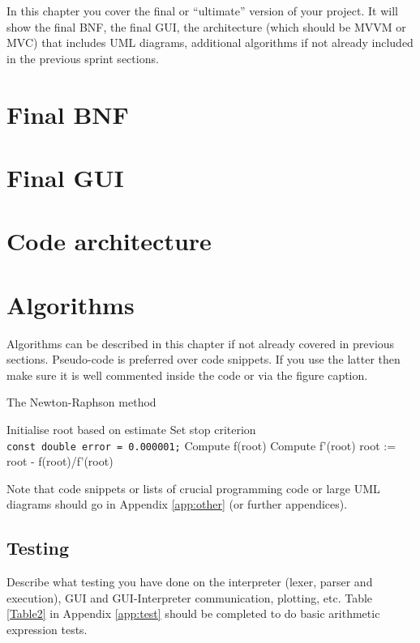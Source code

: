\documentclass[a4paper, oneside, 11pt]{report}
\begin{document}
In this chapter you cover the final or ``ultimate'' version of your project. It will show the final BNF, the final GUI, the architecture (which should be MVVM or MVC) that includes UML diagrams, additional algorithms if not already included in the previous sprint sections.

\section{Final BNF}

\section{Final GUI}

\section{Code architecture}
\label{code-arch}

\section{Algorithms}

Algorithms can be described in this chapter if not already covered in previous sections. Pseudo-code is preferred over code snippets. If you use the latter then make sure it is well commented inside the code or via the figure caption. 

\begin{algorithm}[th]
\caption{ The Newton-Raphson method }
\begin{algorithmic}[1]
\STATE Initialise root based on estimate
\STATE Set stop criterion
\\ \texttt{const double error = 0.000001;}
	\STATE Compute f(root)
	\STATE Compute f'(root)
	\STATE root := root - f(root)/f'(root)
\ENDWHILE
\end{algorithmic}
\end{algorithm}


Note that code snippets or lists of crucial programming code or large UML diagrams should go in Appendix \ref{app:other} (or further appendices).

\subsection{Testing}

Describe what testing you have done on the interpreter (lexer, parser and execution), GUI and GUI-Interpreter communication, plotting, etc. Table \ref{Table2} in Appendix \ref{app:test} should be completed to do basic arithmetic expression tests.
\end{document}
